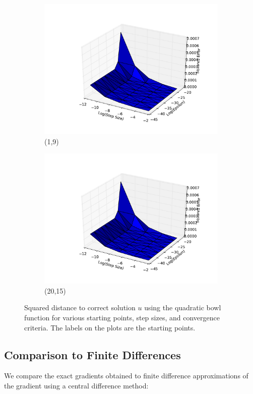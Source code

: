 \documentclass[psamsfonts]{amsart}
\theoremstyle{definition}
\theoremstyle{remark}
\numberwithin{equation}{section}
\begin{document}
\begin{figure}
\begin{subfigure}[b]{0.45\textwidth}
		\includegraphics[width=\textwidth]{hw1_1-2_2.pdf}
		\caption{(1,9)}
	\end{subfigure}
	\begin{subfigure}[b]{0.45\textwidth}
		\includegraphics[width=\textwidth]{hw1_1-2_3.pdf}
		\caption{(20,15)}
	\end{subfigure}
	\caption{Squared distance to correct solution $u$ using the quadratic bowl function for various starting points, step sizes, and convergence criteria. The labels on the plots are the starting points.}
\end{figure}
	

\subsection{Comparison to Finite Differences} We compare the exact gradients obtained to finite difference approximations of the gradient using a central difference method:
\end{document}
